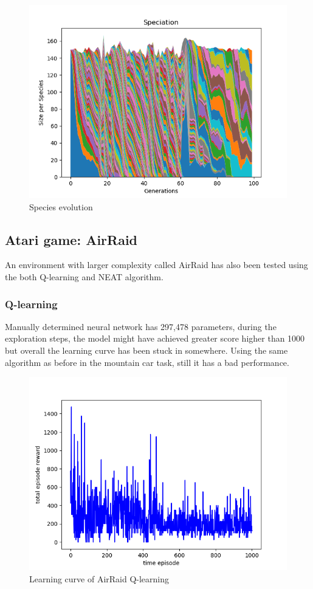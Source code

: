 \documentclass{article}
\begin{document}
 \begin{figure}[htbp]
  \centering
  \includegraphics[width = .7\textwidth]{mountaincarspecies}
  \caption{Species evolution}
  \label{spe1}
 \end{figure}



\subsection{Atari game: AirRaid}
An environment with larger complexity called AirRaid has also been tested using the both Q-learning and NEAT algorithm.

\subsubsection{Q-learning}
Manually determined neural network has 297,478 parameters, during the exploration steps, the model might have achieved greater score 
higher than 1000 but overall the learning curve has been stuck in somewhere. Using the same algorithm as before in the mountain car task, still it has a bad performance.

\begin{figure}[htbp]
  \centering
  \includegraphics[width = .7\textwidth]{airq}
  \caption{Learning curve of AirRaid Q-learning}
  \label{learnq}
 \end{figure}
\end{document}
